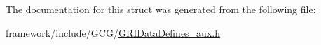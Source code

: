 \-The documentation for this struct was generated from the following file\-:\begin{DoxyCompactItemize}
\item 
framework/include/\-G\-C\-G/\hyperlink{GRIDataDefines__aux_8h}{\-G\-R\-I\-Data\-Defines\-\_\-aux.\-h}\end{DoxyCompactItemize}
